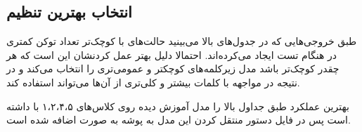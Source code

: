 {{}
\subsection{انتخاب بهترین تنظیم }
{
طبق خروجی‌هایی که در جدول‌های بالا می‌بینید حالت‌های با 
کوچک‌تر تعداد توکن 
کمتری در هنگام تست ایجاد می‌کرده‌اند. احتمالا دلیل بهتر عمل کردنشان این است که هر چقدر 
کوچک‌تر باشد مدل زیرکلمه‌های کوچکتر و عمومی‌تری را انتخاب می‌کند و در نتیجه در مواجهه با کلمات بیشتر و کلی‌تری از آن‌ها می‌تواند استفاده کند.

بهترین عملکرد طبق جداول بالا را مدل آموزش دیده روی کلاس‌های ۱،۲،۴،۵ با 
داشته است پس در فایل 
دستور منتقل کردن این مدل به پوشه 
به صورت  اضافه شده است.
}
}
